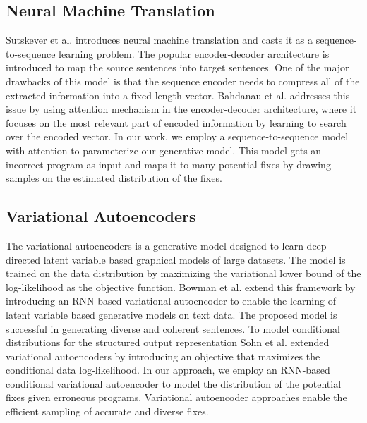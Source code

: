 \documentclass[runningheads]{llncs}
\begin{document}
\subsection{Neural Machine Translation}
Sutskever et al. \cite{sutskever14seq2seq} introduces neural machine translation and casts it as a sequence-to-sequence learning problem. The popular encoder-decoder architecture is introduced to map the source sentences into target sentences. One of the major drawbacks of this model is that the sequence encoder needs to compress all of the extracted information into a fixed-length vector. Bahdanau et al. \cite{Bahdanau2015NeuralMT} addresses this issue by using attention mechanism in the encoder-decoder architecture, where it focuses on the most relevant part of encoded information by learning to search over the encoded vector. In our work, we employ a sequence-to-sequence model with attention to parameterize our generative model. This model gets an incorrect program as input and maps it to many potential fixes by drawing samples on the estimated distribution of the fixes.

\subsection{Variational Autoencoders}
\label{rw_variational_autoencoder}
The variational autoencoders \cite{autoencodr14kingma,variational15rezende} is a generative model designed to learn deep directed latent variable based graphical models of large datasets. The model is trained on the data distribution by maximizing the variational lower bound of the log-likelihood as the objective function. Bowman et al.  \cite{gensen16bowman} extend this framework by introducing an RNN-based variational autoencoder to enable the learning of latent variable based generative models on text data. The proposed model is successful in generating diverse and coherent sentences. To model conditional distributions for the structured output representation Sohn et al. \cite{cvae15sohn} extended variational autoencoders by introducing an objective that maximizes the conditional data log-likelihood. In our approach, we employ an RNN-based conditional variational autoencoder to model the distribution of the potential fixes given erroneous programs. Variational autoencoder approaches enable the efficient sampling of accurate and diverse fixes. 
\end{document}
